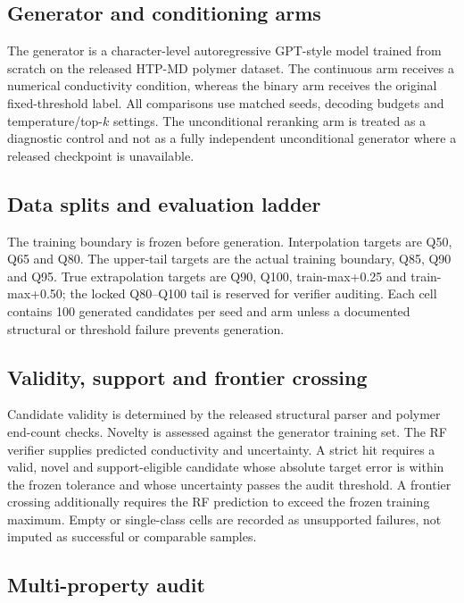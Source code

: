 \subsection*{Generator and conditioning arms}

The generator is a character-level autoregressive GPT-style model trained from scratch on the released HTP-MD polymer dataset. The continuous arm receives a numerical conductivity condition, whereas the binary arm receives the original fixed-threshold label. All comparisons use matched seeds, decoding budgets and temperature/top-$k$ settings. The unconditional reranking arm is treated as a diagnostic control and not as a fully independent unconditional generator where a released checkpoint is unavailable.

\subsection*{Data splits and evaluation ladder}

The training boundary is frozen before generation. Interpolation targets are Q50, Q65 and Q80. The upper-tail targets are the actual training boundary, Q85, Q90 and Q95. True extrapolation targets are Q90, Q100, train-max+0.25 and train-max+0.50; the locked Q80--Q100 tail is reserved for verifier auditing. Each cell contains 100 generated candidates per seed and arm unless a documented structural or threshold failure prevents generation.

\subsection*{Validity, support and frontier crossing}

Candidate validity is determined by the released structural parser and polymer end-count checks. Novelty is assessed against the generator training set. The RF verifier supplies predicted conductivity and uncertainty. A strict hit requires a valid, novel and support-eligible candidate whose absolute target error is within the frozen tolerance and whose uncertainty passes the audit threshold. A frontier crossing additionally requires the RF prediction to exceed the frozen training maximum. Empty or single-class cells are recorded as unsupported failures, not imputed as successful or comparable samples.

\subsection*{Multi-property audit}

